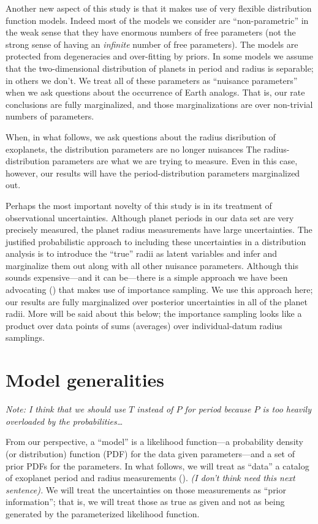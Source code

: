 \documentclass[12pt,preprint]{aastex}
\begin{document}
Another new aspect of this study is that it makes use of very flexible
distribution function models.
Indeed most of the models we consider are ``non-parametric'' in the weak sense
that they have enormous numbers of free parameters (not the strong sense of
having an \emph{infinite} number of free parameters).
The models are protected from degeneracies and over-fitting by priors.
In some models we assume that the two-dimensional distribution of planets in
period and radius is separable; in others we don't.
We treat all of these parameters as ``nuisance parameters'' when we ask
questions about the occurrence of Earth analogs.
That is, our rate conclusions are fully marginalized, and those
marginalizations are over non-trivial numbers of parameters.

When, in what follows, we ask questions about the radius disribution of
exoplanets, the distribution parameters are no longer nuisances The
radius-distribution parameters are what we are trying to measure.
Even in this case, however, our results will have the period-distribution
parameters marginalized out.

Perhaps the most important novelty of this study is in its treatment of
observational uncertainties.
Although planet periods in our data set are very precisely measured, the
planet radius measurements have large uncertainties.
The justified probabilistic approach to including these uncertainties in a
distribution analysis is to introduce the ``true'' radii as latent variables
and infer and marginalize them out along with all other nuisance parameters.
Although this sounds expensive---and it can be---there is a simple approach
we have been advocating (\cite{hogge}) that makes use of importance sampling.
We use this approach here; our results are fully marginalized over posterior
uncertainties in all of the planet radii.
More will be said about this below; the importance sampling looks like a
product over data points of sums (averages) over individual-datum radius
samplings.

\section{Model generalities}

\emph{Note: I think that we should use $T$ instead of $P$ for period because
$P$ is too heavily overloaded by the probabilities\ldots}

From our perspective, a ``model'' is a likelihood function---a probability
density (or distribution) function (PDF) for the data given
parameters---and a set of prior PDFs for the parameters.
In what follows, we will treat as ``data'' a catalog of exoplanet period
and radius measurements (\citealt{petigura}).
\emph{(I don't think need this next sentence).}
We will treat the uncertainties on those measurements as ``prior
information''; that is, we will treat those as true as given and not as being
generated by the parameterized likelihood function.
\end{document}
